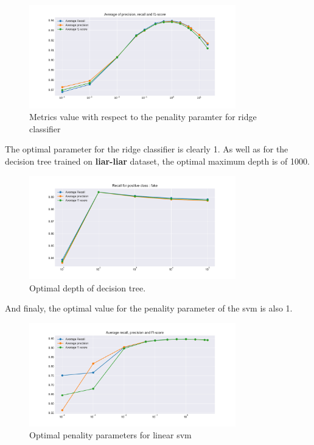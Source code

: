 \begin{figure}
	\centering
	\includegraphics[width=0.8\textwidth]{images/chapitre3/ridge}
	\caption{Metrics value with respect to the penality paramter for ridge classifier}
	\label{fig:chap3:ridge2}
\end{figure}
The optimal parameter for the ridge classifier is clearly 1. As well as for the decision tree trained on \textbf{liar-liar} dataset, the optimal maximum depth is of 1000. 
\begin{figure}
	\centering
	\includegraphics[width=0.8\textwidth]{images/chapitre3/fake-dt}
	\caption{Optimal depth of decision tree.}
	\label{fig:chap3:dt2}
\end{figure}
And finaly, the optimal value for the penality parameter of the svm is also 1.\\
\begin{figure}
	\centering
	\includegraphics[width=0.8\textwidth]{images/chapitre3/svc_fake}
	\caption{Optimal penality parameters for linear svm}
	\label{fig:chap3:lsvm2}
\end{figure}

